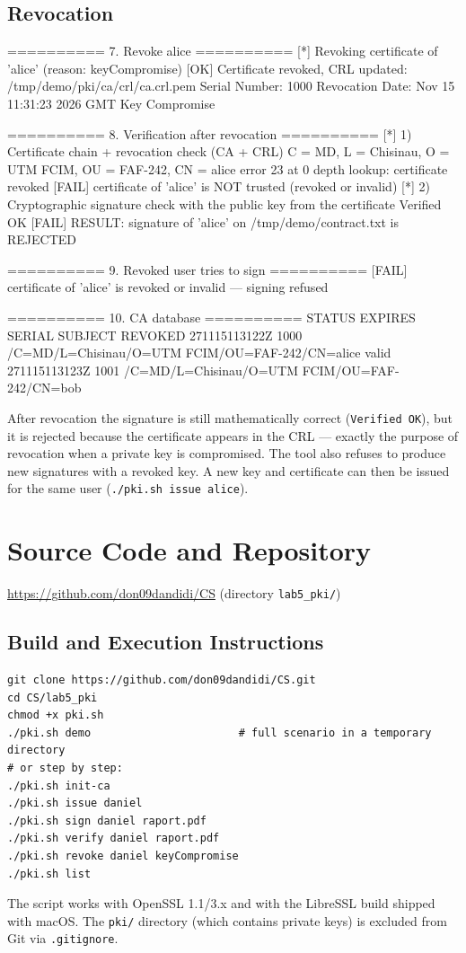 \documentclass[12pt,a4paper]{article}
\begin{document}
\subsection{Revocation}
\begin{terminal}
\begin{termout}
========== 7. Revoke alice ==========
[*] Revoking certificate of 'alice' (reason: keyCompromise)
[OK] Certificate revoked, CRL updated: /tmp/demo/pki/ca/crl/ca.crl.pem
    Serial Number: 1000
        Revocation Date: Nov 15 11:31:23 2026 GMT
                Key Compromise

========== 8. Verification after revocation ==========
[*] 1) Certificate chain + revocation check (CA + CRL)
C = MD, L = Chisinau, O = UTM FCIM, OU = FAF-242, CN = alice
error 23 at 0 depth lookup: certificate revoked
[FAIL] certificate of 'alice' is NOT trusted (revoked or invalid)
[*] 2) Cryptographic signature check with the public key from the certificate
Verified OK
[FAIL] RESULT: signature of 'alice' on /tmp/demo/contract.txt is REJECTED

========== 9. Revoked user tries to sign ==========
[FAIL] certificate of 'alice' is revoked or invalid — signing refused

========== 10. CA database ==========
STATUS EXPIRES          SERIAL   SUBJECT
REVOKED 271115113122Z    1000     /C=MD/L=Chisinau/O=UTM FCIM/OU=FAF-242/CN=alice
valid  271115113123Z    1001     /C=MD/L=Chisinau/O=UTM FCIM/OU=FAF-242/CN=bob
\end{termout}
\end{terminal}
After revocation the signature is still mathematically correct (\texttt{Verified OK}), but it is
rejected because the certificate appears in the CRL — exactly the purpose of revocation when a
private key is compromised. The tool also refuses to produce new signatures with a revoked key.
A new key and certificate can then be issued for the same user (\texttt{./pki.sh issue alice}).

\section{Source Code and Repository}
\begin{center}
\url{https://github.com/don09dandidi/CS} \quad (directory \texttt{lab5\_pki/})
\end{center}
\subsection{Build and Execution Instructions}
\begin{lstlisting}[style=sh]
git clone https://github.com/don09dandidi/CS.git
cd CS/lab5_pki
chmod +x pki.sh
./pki.sh demo                       # full scenario in a temporary directory
# or step by step:
./pki.sh init-ca
./pki.sh issue daniel
./pki.sh sign daniel raport.pdf
./pki.sh verify daniel raport.pdf
./pki.sh revoke daniel keyCompromise
./pki.sh list
\end{lstlisting}
The script works with OpenSSL 1.1/3.x and with the LibreSSL build shipped with macOS. The
\texttt{pki/} directory (which contains private keys) is excluded from Git via \texttt{.gitignore}.
\end{document}
